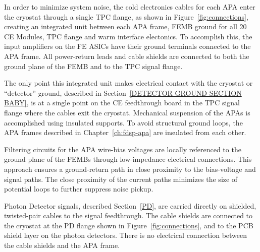 In order to minimize system noise, the cold electronics cables for each APA enter 
the cryostat through a single TPC flange, as shown in Figure~\ref{fig:connections}, creating an integrated 
unit between each APA frame, FEMB ground for all 20 CE Modules, TPC flange and warm interface
electonics. To accomplish this,
the input amplifiers on the FE ASICs have their ground terminals connected to the APA frame. 
All power-return leads and cable shields are connected to both the ground plane of the FEMB and 
to the TPC signal flange.

The only point this integrated unit makes electrical contact with the 
cryostat or ``detector'' ground, described in Section~\ref{DETECTOR GROUND SECTION BABY}, 
is at a single point on the CE feedthrough board in the TPC signal flange where the 
cables exit the cryostat. Mechanical suspension of the APAs is accomplished using insulated supports. 
To avoid structural ground loops, the APA frames described in Chapter~\ref{ch:fdsp-apa} are 
insulated from each other.

Filtering circuits for the APA wire-bias voltages are locally referenced to the ground plane of the FEMBs through low-impedance electrical connections. This approach ensures a ground-return path in close proximity to the bias-voltage and signal paths. The close proximity of the current paths minimizes the size of potential loops to further suppress noise pickup.

Photon Detector signals, described Section~\ref{PD}, are carried directly on shielded, 
twisted-pair cables to the signal feedthrough. The cable shields are connected to the cryostat 
at the PD flange shown in Figure~\ref{fig:connections}, and to the PCB shield layer on the photon 
detectors. There is no electrical connection between the cable shields and the APA frame.

